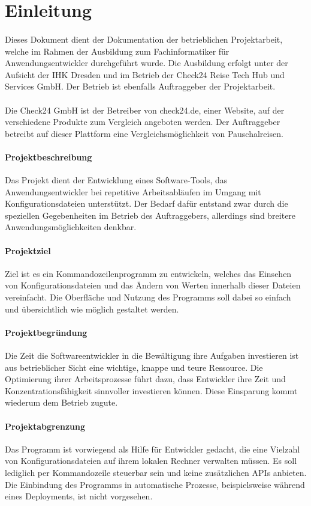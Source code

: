 \section{Einleitung}
\paragraph{}
Dieses Dokument dient der Dokumentation der betrieblichen Projektarbeit, welche
im Rahmen der Ausbildung zum Fachinformatiker für Anwendungsentwickler durchgeführt
wurde. Die Ausbildung erfolgt unter der Aufsicht der IHK Dresden und im Betrieb
der Check24 Reise Tech Hub und Services GmbH. Der Betrieb ist ebenfalls
Auftraggeber der Projektarbeit.

\paragraph{}
Die Check24 GmbH ist der Betreiber von check24.de, einer Website, auf der verschiedene
Produkte zum Vergleich angeboten werden. Der Auftraggeber betreibt auf dieser
Plattform eine Vergleichsmöglichkeit von Pauschalreisen.

\paragraph{Projektbeschreibung}
Das Projekt dient der Entwicklung eines Software-Tools, das Anwendungsentwickler
bei repetitive Arbeitsabläufen im Umgang mit Konfigurationsdateien unterstützt.
Der Bedarf dafür entstand zwar durch die speziellen Gegebenheiten im Betrieb des
Auftraggebers, allerdings sind breitere Anwendungsmöglichkeiten denkbar.

\paragraph{Projektziel}
Ziel ist es ein Kommandozeilenprogramm zu entwickeln, welches das Einsehen von
Konfigurationsdateien und das Ändern von Werten innerhalb dieser Dateien vereinfacht.
Die Oberfläche und Nutzung des Programms soll dabei so einfach und übersichtlich
wie möglich gestaltet werden.

\paragraph{Projektbegründung}
Die Zeit die Softwareentwickler in die Bewältigung ihre Aufgaben investieren
ist aus betrieblicher Sicht eine wichtige, knappe und teure Ressource. Die
Optimierung ihrer Arbeitsprozesse führt dazu, dass Entwickler ihre
Zeit und Konzentrationsfähigkeit sinnvoller investieren können. Diese Einsparung
kommt wiederum dem Betrieb zugute.

\paragraph{Projektabgrenzung}
Das Programm ist vorwiegend als Hilfe für Entwickler gedacht, die eine Vielzahl von
Konfigurationsdateien auf ihrem lokalen Rechner verwalten müssen. Es soll lediglich
per Kommandozeile steuerbar sein und keine zusätzlichen APIs anbieten. Die Einbindung
des Programms in automatische Prozesse, beispielsweise während eines Deployments, ist
nicht vorgesehen.